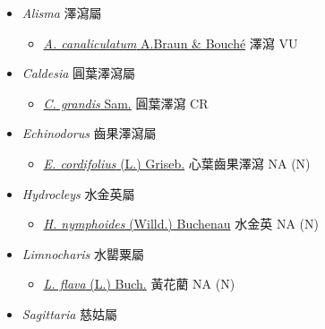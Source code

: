 
  \begin{itemize}
 \item[] \textit{Alisma} 澤瀉屬
                                
  \begin{itemize}
        \item[] \href{http://www.theplantlist.org/tpl1.1/search?q=Alisma+canaliculatum}{\textit{A. canaliculatum} A.Braun \& Bouché}   澤瀉   VU
  \end{itemize}
 \item[] \textit{Caldesia} 圓葉澤瀉屬
                                
  \begin{itemize}
        \item[] \href{http://www.theplantlist.org/tpl1.1/search?q=Caldesia+grandis}{\textit{C. grandis} Sam.}   圓葉澤瀉   CR
  \end{itemize}
 \item[] \textit{Echinodorus} 齒果澤瀉屬
                                
  \begin{itemize}
        \item[] \href{http://www.theplantlist.org/tpl1.1/search?q=Echinodorus+cordifolius}{\textit{E. cordifolius} (L.) Griseb.}   心葉齒果澤瀉   NA (N)
  \end{itemize}
 \item[] \textit{Hydrocleys} 水金英屬
                                
  \begin{itemize}
        \item[] \href{http://www.theplantlist.org/tpl1.1/search?q=Hydrocleys+nymphoides}{\textit{H. nymphoides} (Willd.) Buchenau}   水金英   NA (N)
  \end{itemize}
 \item[] \textit{Limnocharis} 水罌粟屬
                                
  \begin{itemize}
        \item[] \href{http://www.theplantlist.org/tpl1.1/search?q=Limnocharis+flava}{\textit{L. flava} (L.) Buch.}   黃花藺   NA (N)
  \end{itemize}
 \item[] \textit{Sagittaria} 慈姑屬
                                

\end{itemize}
